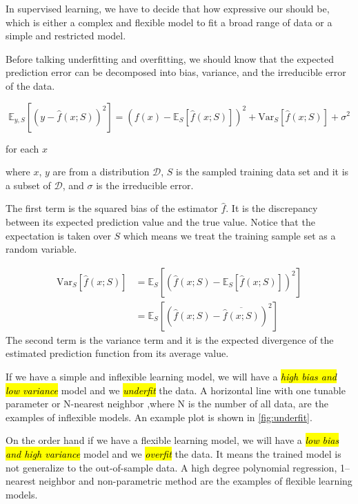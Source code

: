 \documentclass{kthreport}
\begin{document}
In supervised learning, we have to decide that how expressive our should be,
which is either a complex and flexible model to fit a broad range of data or
a simple and restricted model.

Before talking underfitting and overfitting, we should know that the expected prediction error
can be decomposed into bias, variance, and the irreducible error of the data.

\begin{equation}
    \mathbb{E}_{y,S}[(y-\hat{f}(x; S))^2] =
    (f(x) - \mathbb{E}_{S}[\hat{f}(x; S)])^2
    + \mathrm{Var}_{S}[\hat{f}(x; S)]
    + \sigma^2
\end{equation}

for each $x$

where $x$, $y$ are from a distribution $\mathcal{D}$, $S$ is the sampled training
data set and it is a subset of $\mathcal{D}$, and $\sigma$ is the irreducible error.

The first term is the squared bias of the estimator $\hat{f}$.
It is the discrepancy between its expected prediction value and the true value.
Notice that the expectation is taken over $S$ which means we treat the training sample
set as a random variable.

\begin{align}
    \mathrm{Var}_{S}[\hat{f}(x; S)]
    &= \mathbb{E}_{S}[(\hat{f}(x; S) - \mathbb{E}_{S}[\hat{f}(x; S)])^2] \\
    &= \mathbb{E}_{S}[(\hat{f}(x; S) - \overline{\hat{f}(x; S)})^2]
\end{align}
The second term is the variance term and it is
the expected divergence of the estimated prediction function from its average value.


If we have a simple and inflexible learning model, we will have
a \emph{\hl{high bias and low variance}} model and we \emph{\hl{underfit}} the data.
A horizontal line with one tunable parameter or N-nearest neighbor
,where N is the number of all data, are the examples of inflexible models.
An example plot is shown in \cref{fig:underfit}.

On the order hand if we have a flexible learning model,
we will have a \emph{\hl{low bias and high variance}} model and we \emph{\hl{overfit}} the data.
It means the trained model is not generalize to the out-of-sample data. A high
degree polynomial regression, 1--nearest neighbor and non-parametric method are the
examples of flexible learning models.
\end{document}
